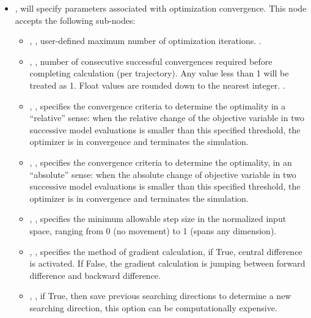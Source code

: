 \begin{itemize}
\item {},  will specify parameters associated with optimization
convergence. This node accepts the following sub-nodes:
  \begin{itemize}
  \item {}, , user-defined maximum number of optimization iterations. .
  \item {}, , number of consecutive successful
    convergences required before completing calculation (per trajectory). Any value less than 1 will be
    treated as 1.  Float values are rounded down to the nearest integer. .
  \item {}, , specifies the convergence criteria to determine the optimality
  in a ``relative'' sense: when the relative change of the objective variable in two successive model evaluations is smaller than
  this specified threshold, the  optimizer is in convergence and terminates the simulation.
  \item {}, , specifies the convergence criteria to determine the optimality,
  in an ``absolute'' sense: when the absolute change of objective variable in two successive model evaluations is smaller
  than this specified threshold, the  optimizer is in convergence and terminates the simulation.
  \item {}, , specifies the minimum allowable step size in
    the normalized input space, ranging from 0 (no movement) to 1 (spans any dimension).
  \item {}, , specifies the method of gradient calculation, if True,
    central difference is activated. If False, the gradient calculation is jumping between forward difference and backward difference.
  \item {}, , if True, then save previous searching directions to determine a new
    searching direction, this option can be computationally expensive.
  \end{itemize}

\end{itemize}
